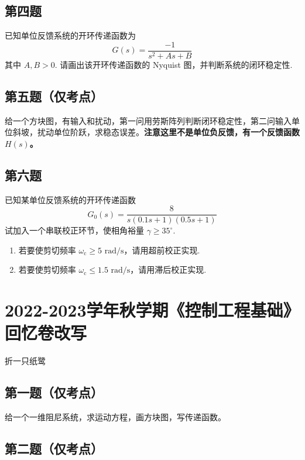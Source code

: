 \documentclass[UTF8]{ctexart}
\newcommand{\rs}{\text{ rad/s}}
\begin{document}
\subsection*{第四题}

已知单位反馈系统的开环传递函数为
\[
G(s)=\frac{-1}{s^2+As+B}
\]
其中 $A,B>0$. 请画出该开环传递函数的 Nyquist 图，并判断系统的闭环稳定性.

\subsection*{第五题（仅考点）}

给一个方块图，有输入和扰动，第一问用劳斯阵列判断闭环稳定性，第二问输入单位斜坡，扰动单位阶跃，求稳态误差。\textbf{注意这里不是单位负反馈，有一个反馈函数 $H(s)$。}

\subsection*{第六题}

已知某单位反馈系统的开环传递函数
\[
G_0(s)=\frac{8}{s(0.1s+1)(0.5s+1)}
\]
试加入一个串联校正环节，使相角裕量 $\gamma\ge 35^\circ$.

\begin{enumerate}
    \item[(1)] 若要使剪切频率 $\omega_\text{c}\ge 5 \rs$，请用超前校正实现.
    \item[(2)] 若要使剪切频率 $\omega_\text{c}\le 1.5 \rs$，请用滞后校正实现.
\end{enumerate}

\newpage
\section*{2022-2023学年秋学期《控制工程基础》回忆卷改写}

\begin{center}
    折一只纸鹭
\end{center}

\subsection*{第一题（仅考点）}

给一个一维阻尼系统，求运动方程，画方块图，写传递函数。

\subsection*{第二题（仅考点）}
\end{document}

